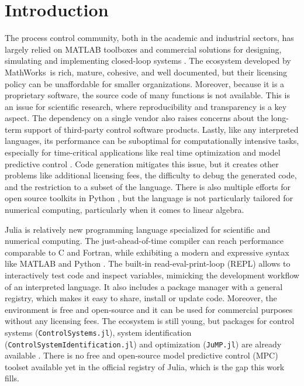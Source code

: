 \section{Introduction}

The process control community, both in the academic and industrial sectors, has largely relied on MATLAB toolboxes and commercial solutions for designing, simulating and implementing closed-loop systems \citep{optimMatlab}. The ecosystem developed by MathWorks\texttrademark\ is rich, mature, cohesive, and well documented, but their licensing policy can be unaffordable for smaller organizations. Moreover, because it is a proprietary software, the source code of many functions is not available. This is an issue for scientific research, where reproducibility and transparency is a key aspect. The dependency on a single vendor also raises concerns about the long-term support of third-party control software products. Lastly, like any interpreted languages, its performance can be suboptimal for computationally intensive tasks, especially for time-critical applications like real time optimization and model predictive control \citep{matlabPythonJulia, juliaML}. Code generation mitigates this issue, but it creates other problems like additional licensing fees, the difficulty to debug the generated code, and the restriction to a subset of the language. There is also multiple efforts for open source toolkits in Python \citep{doMPC, gekko, acados}, but the language is not particularly tailored for numerical computing, particularly when it comes to linear algebra.

Julia is relatively new programming language specialized for scientific and numerical computing. The just-ahead-of-time compiler can reach performance comparable to C and Fortran, while exhibiting a modern and expressive syntax like MATLAB and Python \citep{juliaPaper}. The built-in read-eval-print-loop (REPL) allows to interactively test code and inspect variables, mimicking the development workflow of an interpreted language. It also includes a package manager with a general registry, which makes it easy to share, install or update code. Moreover, the environment is free and open-source and it can be used for commercial purposes without any licensing fees. The ecosystem is still young, but packages for control systems (\texttt{ControlSystems.jl}), system identification (\texttt{ControlSystemIdentification.jl}) and optimization (\texttt{JuMP.jl}) are already available \citep{controlsystems, jump}. There is no free and open-source model predictive control (MPC) toolset available yet in the official registry of Julia, which is the gap this work fills.

